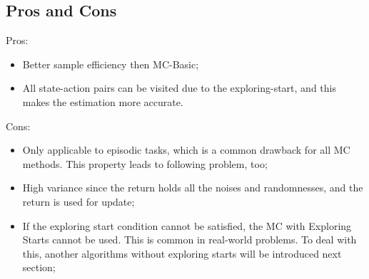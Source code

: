     \subsection{Pros and Cons}
    Pros:
    \begin{itemize}
        \item Better sample efficiency then MC-Basic;
        \item All state-action pairs can be visited due to the exploring-start, and this makes the estimation more accurate.
    \end{itemize}
    Cons:
    \begin{itemize}
        \item Only applicable to episodic tasks, which is a common drawback for all MC methods. This property leads to following problem, too;
        \item High variance since the return holds all the noises and randomnesses, and the return is used for update;
        \item If the exploring start condition cannot be satisfied, the MC with Exploring Starts cannot be used. This is common in real-world problems.
        To deal with this, another algorithms without exploring starts will be introduced next section;
    \end{itemize}